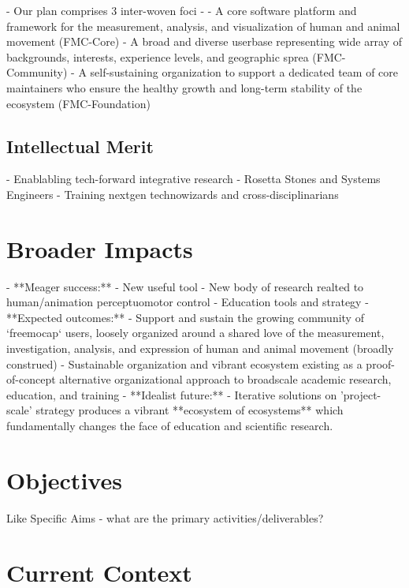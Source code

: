 \documentclass[11pt]{article}
\begin{document}

- Our plan comprises 3 inter-woven foci - 
- A core software platform and framework for the measurement, analysis, and visualization of human and animal movement (FMC-Core)
- A broad and diverse userbase representing wide array of backgrounds, interests, experience levels, and geographic sprea (FMC-Community)
- A self-sustaining organization to support a dedicated team of core maintainers who ensure the healthy growth and long-term stability of the ecosystem (FMC-Foundation)

\subsection{Intellectual Merit\label{sec:IM}}

- Enablabling tech-forward integrative research
- Rosetta Stones and Systems Engineers
- Training nextgen technowizards and cross-disciplinarians

\section{Broader Impacts\label{sec:BI}}
- **Meager success:**
  - New useful tool
  - New body of research realted to human/animation perceptuomotor control
  - Education tools and strategy
- **Expected outcomes:**
  - Support and sustain the growing community of `freemocap` users, loosely organized around a shared love of the measurement, investigation, analysis, and expression of human and animal movement (broadly construed) 
  - Sustainable organization and vibrant ecosystem existing as a proof-of-concept alternative organizational approach to broadscale academic research, education, and training
- **Idealist future:**
  - Iterative solutions on 'project-scale' strategy produces a vibrant **ecosystem of ecosystems** which fundamentally changes the face of education and scientific research.

\section{Objectives}
 Like Specific Aims - what are the primary activities/deliverables?

\newpage

\section{Current Context}
\end{document}
